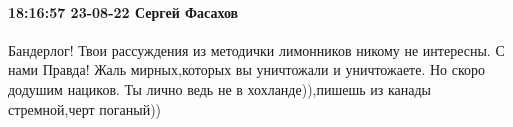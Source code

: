  
 
 
 
 

\paragraph{18:16:57 23-08-22 Сергей Фасахов}

Бандерлог! Твои рассуждения из методички лимонников никому не интересны. С нами
Правда! Жаль мирных,которых вы уничтожали и уничтожаете. Но скоро додушим
нациков. Ты лично ведь не в хохланде)),пишешь из канады стремной,черт поганый))
